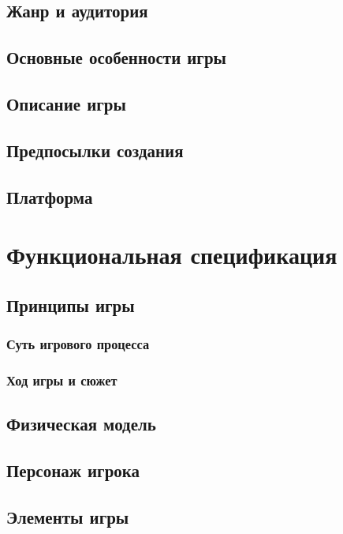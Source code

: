 \documentclass{article}
\begin{document}
\subsection{Жанр и аудитория}

\subsection{Основные особенности игры}

\subsection{Описание игры}

\subsection{Предпосылки создания}

\subsection{Платформа}

\section{Функциональная спецификация}

\subsection{Принципы игры}

\subsubsection{Суть игрового процесса}

\subsubsection{Ход игры и сюжет}

\subsection{Физическая модель}

\subsection{Персонаж игрока}

\subsection{Элементы игры}
\end{document}
